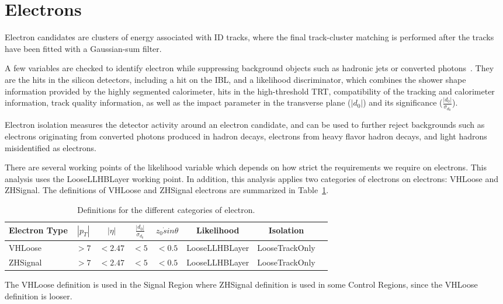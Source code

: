 \section{Electrons}
\label{sec:el}
\par Electron candidates are clusters of energy associated with ID tracks, 
where the final track-cluster matching is performed after the tracks have been fitted with a Gaussian-sum filter.
\par A few variables are checked to identify electron while suppressing background objects 
such as hadronic jets or converted photons~\cite{ATL-PHYS-PUB-2015-041}. 
They are the hits in the silicon detectors, including a hit on the IBL, and a likelihood discriminator, 
which combines the shower shape information provided by the highly segmented calorimeter, hits in the high-threshold TRT, 
compatibility of the tracking and calorimeter information, track quality information, 
as well as the impact parameter in the transverse plane ($|d_0|$) and its significance ($\frac{|d_0|}{\sigma_{d_0}}$).
\par Electron isolation measures the detector activity around an electron candidate, 
and can be used to further reject backgrounds such as electrons originating from converted photons produced in hadron decays, 
electrons from heavy flavor hadron decays, and light hadrons misidentified as electrons.
\par There are several working points of the likelihood variable which depends on how strict the requirements we require on electrons. 
This analysis uses the LooseLLHBLayer working point. In addition, this analysis applies two categories of electrons on electrons:
VHLoose and ZHSignal. The definitions of VHLoose and ZHSignal electrons are summarized in Table~\ref{tab:el}.
\begin{table}[tbh]
\centering
\begin{tabular}{|l|c|c|c|c|c|c|c}
\hline
Electron Type & $|p_T|$ & $|\eta|$ & $\frac{|d_0|}{\sigma_{d_0}}$ & $z_0\dot sin\theta$ & Likelihood & Isolation \\
\hline 
VHLoose &$>7$&$<2.47$&$<5$&$<0.5$&LooseLLHBLayer&LooseTrackOnly\\
\hline 
ZHSignal&$>7$&$<2.47$&$<5$&$<0.5$&LooseLLHBLayer&LooseTrackOnly\\
\hline

\end{tabular}
\caption{Definitions for the different categories of electron.}
\label{tab:el}
\end{table}
\par The VHLoose definition is used in the Signal Region where ZHSignal definition is used in some Control Regions, since the VHLoose definition is looser.
 
